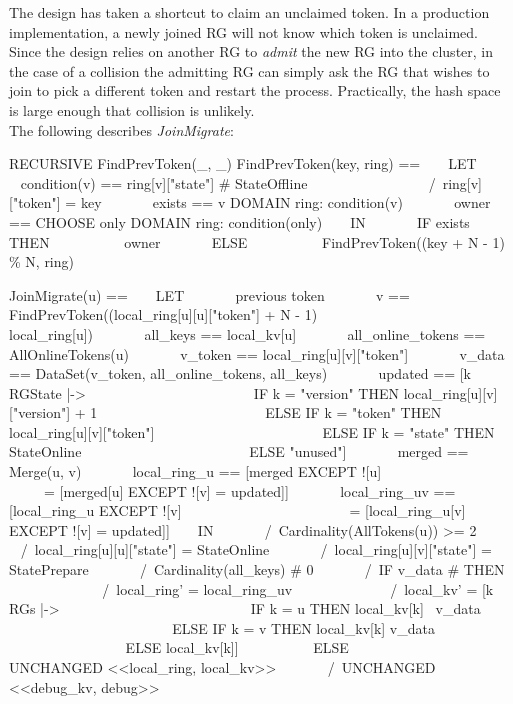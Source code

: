 The design has taken a shortcut to claim an unclaimed token. In a production
implementation, a newly joined RG will not know which token is unclaimed. Since
the design relies on another RG to \textit{admit} the new RG into the cluster,
in the case of a collision the admitting RG can simply ask the RG that wishes to
join to pick a different token and restart the process. Practically, the hash
space is large enough that collision is unlikely.\\

The following describes \textit{JoinMigrate}:\\
\begin{tla}
RECURSIVE FindPrevToken(_, _)
FindPrevToken(key, ring) ==
    LET 
        condition(v) == ring[v]["state"] # StateOffline 
                    /\ ring[v]["token"] = key
        exists == \E v \in DOMAIN ring: condition(v)
        owner == CHOOSE only \in DOMAIN ring: condition(only)
    IN 
        IF exists THEN
            owner
        ELSE 
            FindPrevToken((key + N - 1) \% N, ring)

JoinMigrate(u) == 
    LET 
        \* previous token
        v == FindPrevToken((local_ring[u][u]["token"] + N - 1) %
                            local_ring[u])
        all_keys == local_kv[u]
        all_online_tokens == AllOnlineTokens(u)
        v_token == local_ring[u][v]["token"]
        v_data == DataSet(v_token, all_online_tokens, all_keys)
        updated == [k \in RGState |-> 
                            IF k = "version" THEN local_ring[u][v]["version"] + 1
                            ELSE IF k = "token" THEN local_ring[u][v]["token"]
                            ELSE IF k = "state" THEN StateOnline
                            ELSE "unused"]
        merged == Merge(u, v)
        local_ring_u == [merged EXCEPT ![u] 
                            = [merged[u] EXCEPT ![v] = updated]]
        local_ring_uv == [local_ring_u EXCEPT ![v] 
                            = [local_ring_u[v] EXCEPT ![v] = updated]]
    IN 
        /\ Cardinality(AllTokens(u)) >= 2
        /\ local_ring[u][u]["state"] = StateOnline
        /\ local_ring[u][v]["state"] = StatePrepare
        /\ Cardinality(all_keys) # 0
        /\ IF v_data # {} THEN 
                /\ local_ring' = local_ring_uv
                /\ local_kv' = [k \in RGs |-> 
                                IF k = u THEN local_kv[k] \ v_data
                                ELSE IF k = v THEN local_kv[k] \cup v_data
                                ELSE local_kv[k]]
            ELSE 
                UNCHANGED <<local_ring, local_kv>>
        /\ UNCHANGED <<debug_kv, debug>>
\end{tla}
